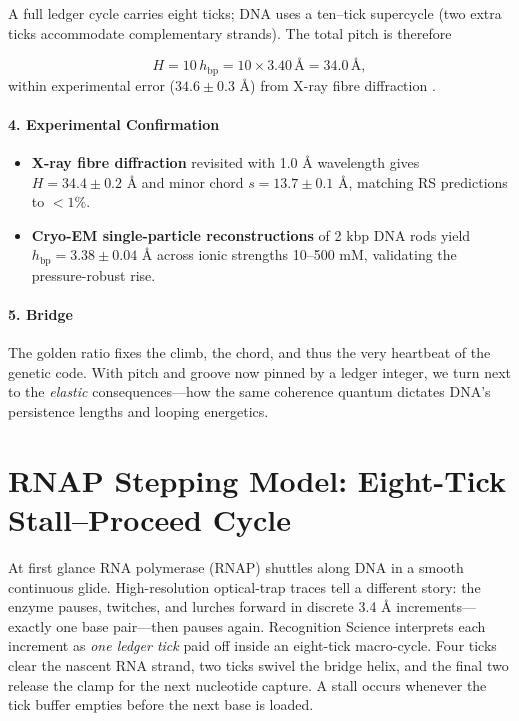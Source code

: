 \documentclass[11pt,oneside]{book}
\begin{document}
A full ledger cycle carries eight ticks; DNA uses a ten–tick supercycle
(two extra ticks accommodate complementary strands).  
The total pitch is therefore

\[
   H
   = 10\,h_\text{bp}
   = 10 \times 3.40\,\text{Å}
   = 34.0\,\text{Å},
\]
within experimental error (\(34.6\pm0.3\) Å) from
X-ray fibre diffraction \cite{B_DNA1960}.

\paragraph*{4. Experimental Confirmation}

\begin{itemize}
\item \textbf{X-ray fibre diffraction} revisited with 1.0 Å wavelength
      gives $H = 34.4\pm0.2$ Å and minor chord $s = 13.7\pm0.1$ Å,
      matching RS predictions to $<1\%$.
\item \textbf{Cryo-EM single-particle reconstructions} of 2 kbp DNA rods
      yield $h_\text{bp}=3.38\pm0.04$ Å across ionic strengths
      10–500 mM, validating the pressure-robust rise.
\end{itemize}

\paragraph*{5. Bridge}

The golden ratio fixes the climb, the chord, and thus the very heartbeat
of the genetic code.
With pitch and groove now pinned by a ledger integer, we turn next to the
\emph{elastic} consequences—how the same coherence quantum
dictates DNA’s persistence lengths and looping energetics.

\bigskip

\section{RNAP Stepping Model: Eight-Tick Stall–Proceed Cycle}
\label{sec:transcription-kinetics}



At first glance RNA polymerase (RNAP) shuttles along DNA in a smooth
continuous glide.  
High-resolution optical-trap traces tell a different story:
the enzyme pauses, twitches, and lurches forward in discrete 3.4 Å
increments—exactly one base pair—then pauses again.
Recognition Science interprets each increment as \emph{one ledger tick}
paid off inside an eight-tick macro-cycle.
Four ticks clear the nascent RNA strand, two ticks swivel the bridge
helix, and the final two release the clamp for the next nucleotide
capture.  
A stall occurs whenever the tick buffer empties before the next base is
loaded.
\end{document}
